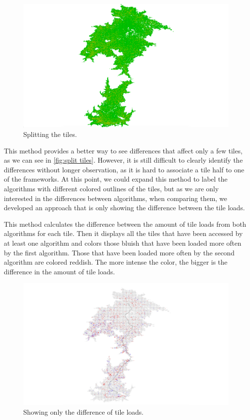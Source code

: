 \documentclass
[
    paper = a4,
    pagesize,
    12 pt,
    oneside,                       %
    open = right,
    DIV = calc,
    BCOR = 0 mm,                   %
    bibtotoc
]
{scrbook}
\begin{document}
\begin{figure}[H]
    \includegraphics[width=\textwidth]{Images/vis-compare-splitted.png}
\caption[]{Splitting the tiles.}
\label{fig:splitted tiles}
\end{figure}

This method provides a better way to see differences that affect only a few tiles, as we can see in \cref{fig:split tiles}.
However, it is still difficult to clearly identify the differences without longer observation, as it is hard to associate a tile half to one of the frameworks.
At this point, we could expand this method to label the algorithms with different colored outlines of the tiles, but as we are only interested in the differences between algorithms, when comparing them, we developed an approach that is only showing the difference between the tile loads.

This method calculates the difference between the amount of tile loads from both algorithms for each tile.
Then it displays all the tiles that have been accessed by at least one algorithm and colors those bluish that have been loaded more often by the first algorithm.
Those that have been loaded more often by the second algorithm are colored reddish.
The more intense the color, the bigger is the difference in the amount of tile loads.

\begin{figure}[H]
    \includegraphics[width=\textwidth]{Images/vis-compare-colored.png}
\caption[]{Showing only the difference of tile loads.}
\label{fig:difference}
\end{figure}
\end{document}

